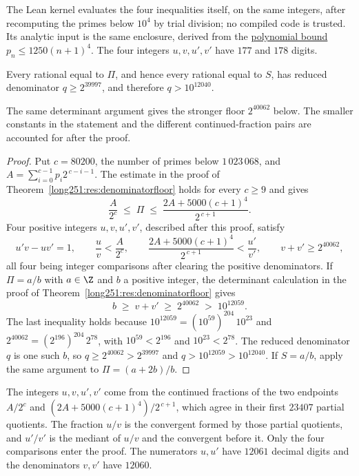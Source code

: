 \noindent The Lean kernel evaluates the four inequalities itself, on the
same integers, after recomputing the primes below $10^4$ by trial
division; no compiled code is trusted.  Its analytic input is the same
enclosure, derived from the
\href{https://github.com/wcook04/plectis-erdos/blob/3d6d938d696fed0fb71dd55115a18a73738ff223/lean/ErdosProblems/Erdos251/PrimeGapDyadicTail.lean\#L360}{polynomial
bound} $p_n\le1250(n+1)^4$.  The four integers $u,v,u',v'$ have $177$
and $178$ digits.

\begin{theorem}\label{long251:res:cfexclusion}
Every rational equal to $\Pi$, and hence every rational equal to $S$, has
reduced denominator $q\ge2^{39997}$, and therefore $q>10^{12040}$.
\end{theorem}

The same determinant argument gives the stronger floor $2^{40062}$
below.  The smaller constants in the statement and the different
continued-fraction pairs are accounted for after the proof.

\begin{proof}
Put $c=80200$, the number of primes below $1\,023\,068$, and
$A=\sum_{i=0}^{c-1}p_i2^{\,c-i-1}$.  The estimate in the proof of
Theorem~\ref{long251:res:denominatorfloor} holds for every $c\ge9$ and gives
\[
 \frac{A}{2^{c}}\;\le\;\Pi\;\le\;\frac{2A+5000(c+1)^4}{2^{\,c+1}} .
\]
Four positive integers $u,v,u',v'$, described after this proof, satisfy
\[
 u'v-uv'=1,\qquad
 \frac uv<\frac{A}{2^{c}},\qquad
 \frac{2A+5000(c+1)^4}{2^{\,c+1}}<\frac{u'}{v'},\qquad
 v+v'\ge2^{40062},
\]
all four being integer comparisons after clearing the positive denominators.
If $\Pi=a/b$ with $a\in\Z$ and $b$ a positive integer, the determinant
calculation in the proof of Theorem~\ref{long251:res:denominatorfloor} gives
\[
 b\;\ge\;v+v'\;\ge\;2^{40062}\;>\;10^{12059}.
\]
The last inequality holds because $10^{12059}=(10^{59})^{204}\,10^{23}$ and
$2^{40062}=(2^{196})^{204}\,2^{78}$, with $10^{59}<2^{196}$ and
$10^{23}<2^{78}$.  The reduced denominator $q$ is one such $b$, so
$q\ge2^{40062}>2^{39997}$ and $q>10^{12059}>10^{12040}$.  If $S=a/b$, apply
the same argument to $\Pi=(a+2b)/b$.
\end{proof}

\noindent The integers $u,v,u',v'$ come from the continued fractions of the
two endpoints $A/2^{c}$ and $(2A+5000(c+1)^4)/2^{\,c+1}$, which agree in their
first $23407$ partial quotients.  The fraction $u/v$ is the convergent formed by
those partial quotients, and $u'/v'$ is the mediant of $u/v$ and the convergent
before it.  Only the four comparisons enter the proof.  The numerators $u,u'$
have $12061$ decimal digits and the denominators $v,v'$ have $12060$.

